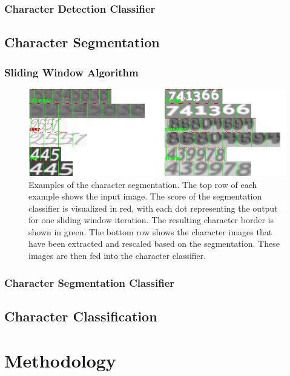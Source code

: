 \documentclass[11pt]{article}
\begin{document}
\subsubsection{Character Detection Classifier}






\subsection{Character Segmentation}
\subsubsection{Sliding Window Algorithm}
\begin{figure}[ht]
    \centering
    \includegraphics[width=1.1\linewidth]{fig/segmentation}
    \caption{
      Examples of the character segmentation. The top row of each example shows the input
      image. The score of the segmentation classifier is visualized in red, with each dot representing
      the output for one sliding window iteration. The resulting character border is shown in green.
      The bottom row shows the character images that have been extracted and rescaled based on the
      segmentation. These images are then fed into the character classifier. }
    \label{fig:segmentation}
\end{figure}
\subsubsection{Character Segmentation Classifier}


\subsection{Character Classification}

\section{Methodology}
\end{document}
